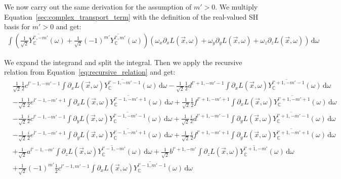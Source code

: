 \documentclass{egpubl}
\newcommand{\ud}{\,\mathrm{d}} %
\begin{document}
We now carry out the same derivation for the assumption of $m'>0$. We multiply Equation~\ref{sec:complex_transport_term} with the definition of the real-valued SH basis for $m'>0$ and get:
\begin{align*}
\int{\left(\frac{1}{\sqrt{2}}\overline{Y_{\mathbb{C}}^{l', -m'}}(\omega )+\frac{1}{\sqrt{2}}\left({-1}\right)^{m'}\overline{Y_{\mathbb{C}}^{l', m'}}(\omega )\right)\left(\omega_{x}\partial_xL\left (\vec{x} ,\omega \right )+\omega_{y}\partial_yL\left (\vec{x} ,\omega \right )+\omega_{z}\partial_zL\left (\vec{x} ,\omega \right )\right)\ud\omega}
\end{align*}


We expand the integrand and split the integral. Then we apply the recursive relation from Equation~\ref{eq:recursive_relation} and get:
\begin{align*}
&
\frac{1}{\sqrt{2}}\frac{1}{2}c^{{l'-1,-m'-1}}\int{\partial_xL\left (\vec{x} ,\omega \right )\overline{Y_{\mathbb{C}}^{l'-1, -m'-1}}(\omega )\ud\omega}
-\frac{1}{\sqrt{2}}\frac{1}{2}d^{{l'+1,-m'-1}}\int{\partial_xL\left (\vec{x} ,\omega \right )\overline{Y_{\mathbb{C}}^{l'+1, -m'-1}}(\omega )\ud\omega}
\\&
-\frac{1}{\sqrt{2}}\frac{1}{2}e^{{l'-1,-m'+1}}\int{\partial_xL\left (\vec{x} ,\omega \right )\overline{Y_{\mathbb{C}}^{l'-1, -m'+1}}(\omega )\ud\omega}
+\frac{1}{\sqrt{2}}\frac{1}{2}f^{{l'+1,-m'+1}}\int{\partial_xL\left (\vec{x} ,\omega \right )\overline{Y_{\mathbb{C}}^{l'+1, -m'+1}}(\omega )\ud\omega}
\\&
-\frac{1}{\sqrt{2}}\frac{i}{2}c^{{l'-1,-m'-1}}\int{\partial_yL\left (\vec{x} ,\omega \right )\overline{Y_{\mathbb{C}}^{l'-1, -m'-1}}(\omega )\ud\omega}
+\frac{1}{\sqrt{2}}\frac{i}{2}d^{{l'+1,-m'-1}}\int{\partial_yL\left (\vec{x} ,\omega \right )\overline{Y_{\mathbb{C}}^{l'+1, -m'-1}}(\omega )\ud\omega}
\\&
-\frac{1}{\sqrt{2}}\frac{i}{2}e^{{l'-1,-m'+1}}\int{\partial_yL\left (\vec{x} ,\omega \right )\overline{Y_{\mathbb{C}}^{l'-1, -m'+1}}(\omega )\ud\omega}
+\frac{1}{\sqrt{2}}\frac{i}{2}f^{{l'+1,-m'+1}}\int{\partial_yL\left (\vec{x} ,\omega \right )\overline{Y_{\mathbb{C}}^{l'+1, -m'+1}}(\omega )\ud\omega}
\\&
+\frac{1}{\sqrt{2}}a^{{l'-1,-m'}}\int{\partial_zL\left (\vec{x} ,\omega \right )\overline{Y_{\mathbb{C}}^{l'-1, -m'}}(\omega )\ud\omega}
+\frac{1}{\sqrt{2}}b^{{l'+1,-m'}}\int{\partial_zL\left (\vec{x} ,\omega \right )\overline{Y_{\mathbb{C}}^{l'+1, -m'}}(\omega )\ud\omega}
\\&
+\frac{1}{\sqrt{2}}\left({-1}\right)^{m'}\frac{1}{2}c^{{l'-1,m'-1}}\int{\partial_xL\left (\vec{x} ,\omega \right )\overline{Y_{\mathbb{C}}^{l'-1, m'-1}}(\omega )\ud\omega}

\end{align*}
\end{document}
